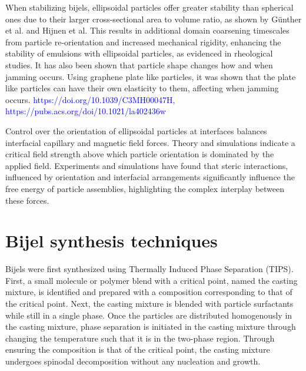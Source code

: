When stabilizing bijels, ellipsoidal particles offer greater stability than spherical ones due to their larger cross-sectional area to volume ratio, 
as shown by Günther et al. and Hijnen et al. \cite{gunther_timescales_2014, hijnen_bijels_2015} This results in additional domain coarsening timescales 
from particle re-orientation and increased mechanical rigidity, enhancing the stability of emulsions with ellipsoidal particles, as evidenced in rheological 
studies. \cite{gunther_timescales_2014, daware_emulsions_2015, witt_bijel_2013} It has also been shown that particle shape changes how and when jamming occurs. 
Using graphene plate like particles, it was shown that the plate like particles can have their own elasticity to them, affecting when jamming occurs. 
\textcolor{blue}{https://doi.org/10.1039/C3MH00047H, https://pubs.acs.org/doi/10.1021/la402436w}

Control over the orientation of ellipsoidal particles at interfaces balances interfacial capillary and magnetic field forces. 
\cite{bresme_orientational_2007, davies_assembling_2014} Theory and simulations indicate a critical field strength above which particle orientation 
is dominated by the applied field. \cite{bresme_orientational_2007, davies_assembling_2014} Experiments and simulations have found that steric interactions, 
influenced by orientation and interfacial arrangements significantly influence the free energy of particle assemblies, highlighting the complex interplay 
between these forces. \cite{morgan_understanding_2013, newton_influence_2014, newton_capillary_2018}


\section{Bijel synthesis techniques}

Bijels were first synthesized using Thermally Induced Phase Separation (TIPS). \cite{herzig_bicontinuous_2007, lee_bicontinuous_2010, bai_dynamics_2015} 
First, a small molecule or polymer blend with a critical point, named the casting mixture, is identified and prepared with a composition corresponding to 
that of the critical point. Next, the casting mixture is blended with particle surfactants while still in a single phase. Once the particles are distributed 
homogenously in the casting mixture, phase separation is initiated in the casting mixture through changing the temperature such that it is in the two-phase region. 
Through ensuring the composition is that of the critical point, the casting mixture undergoes spinodal decomposition without any nucleation and growth. 

